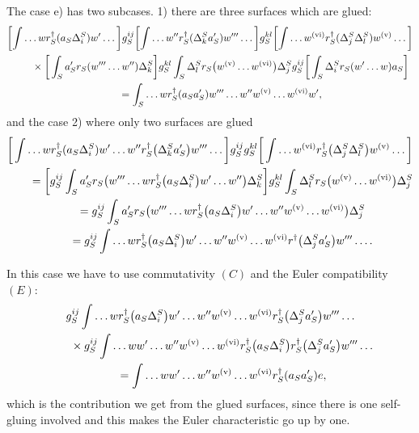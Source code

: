 \documentclass[pdftex]{sigma}
\def\idagger{r^{\dagger}}
\def\res{r}
\begin{document}
The case e) has two subcases. 1) there are three surfaces which are
glued:
\begin{gather*}
\bigg[\!\int \dots w  \idagger_{S}(a_S \Delta^{S}_{i}) w'\dots \bigg]
g^{ij}_{S}
\bigg[\!\int \dots w''  \idagger_{S}( \Delta^{S}_{k} a'_S) w'''\dots \bigg] g^{kl}_{S}
\bigg[\!\int  \dots w^{\rm (vi)} \idagger_{S}( \Delta_j^{S} \Delta_l^{S}) w^{\rm (v)} \dots \bigg]   \\
\qquad{}\times\bigg[ \int_S a'_S\res_S( w'''\dots w'' )\Delta^{S}_{k} \bigg ] g^{kl}_{S}
\int _S  \Delta_l^S \res_S\big(w^{\rm (v)} \dots w^{\rm (vi)}\big)\Delta_j^{S}
  g^{ij}_{S}\bigg[\int_S  \Delta^{S}_{i}\res_S( w' \dots w)a_S\bigg]   \\
\qquad{} = \int_S \dots w\idagger_S(a_Sa'_S) w'''\dots w'' w^{\rm (v)} \dots w^{\rm (vi)} w',
\end{gather*}
and the case 2) where only two surfaces are glued %
\begin{gather*}
\bigg[\int \dots w  \idagger_{S}(a_S \Delta^{S}_{i}) w' \dots w''
\idagger_{S}\big( \Delta^{S}_{k} a'_S\big) w'''\dots \bigg] g^{ij}_{S}
g^{kl}_{S} \bigg[\int  \dots w^{\rm (vi)} \idagger_{S}\big( \Delta_j^{S} \Delta_l^{S}\big) w^{\rm (v)} \dots \bigg]   \\
\qquad{} =\bigg[
 g^{ij}_{S} \int_S a'_S\res_S\big( w'''\dots w  \idagger_{S}\big(a_S \Delta^{S}_{i}\big) w' \dots w'' \big)\Delta^{S}_{k}  \bigg] g^{kl}_{S}
 \int _S \Delta_l^S \res_S\big(w^{\rm (v)} \dots w^{\rm (vi)} \big) \Delta_j^{S}
 \\
\qquad{} = g^{ij}_{S} \int_S a'_S\res_S\big( w'''\dots w  \idagger_{S}\big(a_S \Delta^{S}_{i}\big) w' \dots w'' w^{\rm (v)} \dots w^{\rm (vi)} \big) \Delta_j^{S} \\
\qquad{}=  g^{ij}_{S}\int  \dots w  \idagger_{S}\big(a_S \Delta^{S}_{i}\big) w' \dots w'' w^{\rm (v)} \dots w^{\rm (vi)} \idagger\big(\Delta_j^S a_S'\big)w''' \dots.
\end{gather*}

In this case we have to use commutativity $(C)$ and
the Euler compatibility $(E)$:
\begin{gather*}
  g^{ij}_{S}\int  \dots w  \idagger_{S}\big(a_S \Delta^{S}_{i}\big) w' \dots w'' w^{\rm (v)} \dots w^{\rm (vi)} \idagger_S\big(\Delta_j^S a_S'\big)w''' \dots \\
\qquad {}\times g^{ij}_{S}\int  \dots w   w' \dots w'' w^{\rm (v)} \dots w^{\rm (vi)}\idagger_{S}\big(a_S \Delta^{S}_{i}\big) \idagger_S\big(\Delta_j^S a_S'\big)w''' \dots \\
\qquad{} =\int \dots w  w' \dots w'' w^{\rm (v)} \dots w^{\rm (vi)} \idagger_S(a_Sa'_S) e,
\end{gather*}
which is the contribution we get from the glued surfaces, since there is one self-gluing involved  and
this makes the Euler characteristic go up by one.
\end{document}
